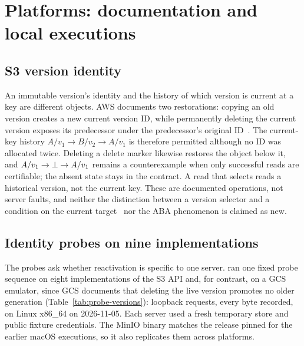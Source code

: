 \section{Platforms: documentation and local executions}\label{sec:platforms}

\subsection{S3 version identity}
An immutable version's identity and the history of which version is current
at a key are different objects. AWS documents two restorations: copying an old
version creates a new current version ID, while permanently deleting the
current version exposes its predecessor under the predecessor's original
ID~\cite{s3restore}. The current-key history $A/v_1\to B/v_2\to A/v_1$ is
therefore permitted although no ID was allocated twice. Deleting a delete marker
likewise restores the object below it, and $A/v_1\to\bot\to A/v_1$ remains a
counterexample when only successful reads are certifiable; the absent state
stays in the contract. A read that selects  reads a
historical version, not the current key. These are documented operations, not
server faults, and neither the distinction between a version selector and a
condition on the current target~\cite{opendal} nor the ABA phenomenon is
claimed as new.

\subsection{Identity probes on nine implementations}
The probes ask whether reactivation is specific to one server.
 ran one fixed probe sequence on eight
implementations of the S3 API and, for contrast, on a GCS emulator, since GCS
documents that deleting the live version promotes no older generation
(Table~\ref{tab:probe-versions}):
\nProbeRequests{} loopback requests, every byte recorded, on Linux x86\_64 on
2026-11-05. Each server used a fresh temporary store and public fixture
credentials. The MinIO binary matches the release pinned for the earlier macOS
executions, so it also replicates them across platforms.

\begin{table}[t]
\caption{Implementations probed, their releases and the requests sent to each.}
\label{tab:probe-versions}
\small

\end{table}

